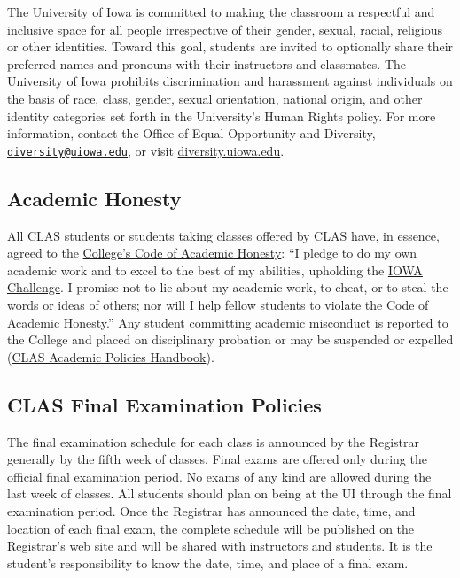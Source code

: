 \documentclass[11pt,]{article}
\theoremstyle{definition}
\theoremstyle{definition}
\theoremstyle{definition}
\theoremstyle{remark}
\begin{document}
The University of Iowa is committed to making the classroom a respectful
and inclusive space for all people irrespective of their gender, sexual,
racial, religious or other identities. Toward this goal, students are
invited to optionally share their preferred names and pronouns with
their instructors and classmates. The University of Iowa prohibits
discrimination and harassment against individuals on the basis of race,
class, gender, sexual orientation, national origin, and other identity
categories set forth in the University's Human Rights policy. For more
information, contact the Office of Equal Opportunity and Diversity,
\href{mailto:diversity@uiowa.edu}{\nolinkurl{diversity@uiowa.edu}}, or
visit
\href{https://diversity.uiowa.edu/office/equal-opportunity-and-diversity}{diversity.uiowa.edu}.

\subsection{Academic Honesty}\label{academic-honesty}

All CLAS students or students taking classes offered by CLAS have, in
essence, agreed to the
\href{https://clas.uiowa.edu/students/handbook/academic-fraud-honor-code}{College's
Code of Academic Honesty}: ``I pledge to do my own academic work and to
excel to the best of my abilities, upholding the
\href{https://newstudents.uiowa.edu/iowa-challenge}{IOWA Challenge}. I
promise not to lie about my academic work, to cheat, or to steal the
words or ideas of others; nor will I help fellow students to violate the
Code of Academic Honesty.'' Any student committing academic misconduct
is reported to the College and placed on disciplinary probation or may
be suspended or expelled
(\href{https://clas.uiowa.edu/students/handbook}{CLAS Academic Policies
Handbook}).

\subsection{CLAS Final Examination
Policies}\label{clas-final-examination-policies}

The final examination schedule for each class is announced by the
Registrar generally by the fifth week of classes. Final exams are
offered only during the official final examination period. No exams of
any kind are allowed during the last week of classes. All students
should plan on being at the UI through the final examination period.
Once the Registrar has announced the date, time, and location of each
final exam, the complete schedule will be published on the Registrar's
web site and will be shared with instructors and students. It is the
student's responsibility to know the date, time, and place of a final
exam.
\end{document}
